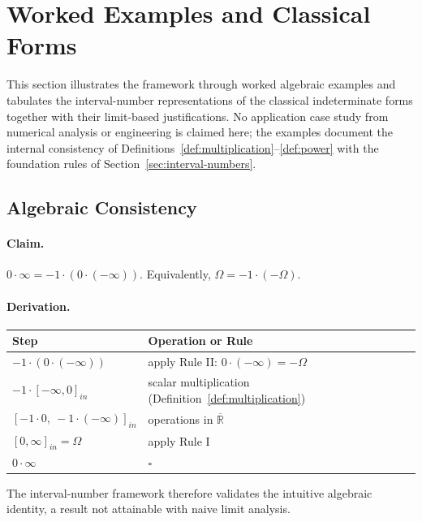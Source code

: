 \documentclass[11pt,a4paper]{article}
\theoremstyle{paperdef}
\newcommand{\Rext}{\overline{\mathbb{R}}}
\newcommand{\inI}[1]{[#1]_{in}}
\begin{document}
\section{Worked Examples and Classical Forms}\label{sec:applications}

This section illustrates the framework through worked algebraic
examples and tabulates the interval-number representations of the
classical indeterminate forms together with their limit-based
justifications. No application case study from numerical analysis or
engineering is claimed here; the examples document the internal
consistency of Definitions~\ref{def:multiplication}--\ref{def:power}
with the foundation rules of Section~\ref{sec:interval-numbers}.

\subsection{Algebraic Consistency}\label{sec:algebraic-consistency}

\paragraph{Claim.}
$0 \cdot \infty = -1 \cdot (0 \cdot (-\infty))$. Equivalently,
$\Omega = -1 \cdot (-\Omega)$.

\paragraph{Derivation.}
\begin{center}
\begin{tabular}{@{}ll@{}}
\toprule
Step & Operation or Rule \\
\midrule
$-1 \cdot (0 \cdot (-\infty))$ & apply Rule II:
  $0 \cdot (-\infty) = -\Omega$ \\
$-1 \cdot \inI{-\infty, 0}$ & scalar multiplication
  (Definition~\ref{def:multiplication}) \\
$\inI{-1 \cdot 0,\ -1 \cdot (-\infty)}$ & operations in $\Rext$ \\
$\inI{0, \infty} = \Omega$ & apply Rule I \\
$0 \cdot \infty$ & $\square$ \\
\bottomrule
\end{tabular}
\end{center}

The interval-number framework therefore validates the intuitive
algebraic identity, a result not attainable with naive limit
analysis.
\end{document}
